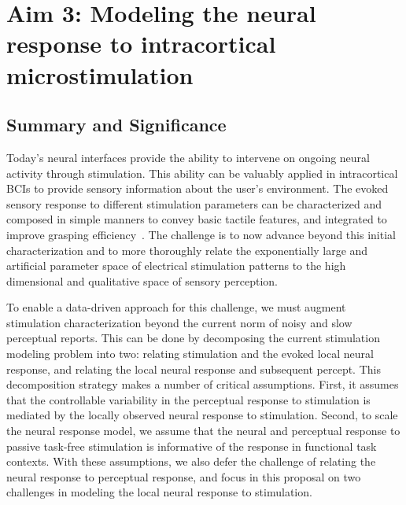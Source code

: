 \documentclass[12pt,oneside]{report}
\begin{document}

\chapter{Aim 3: Modeling the neural response to intracortical microstimulation}


\section{Summary and Significance}

Today’s neural interfaces provide the ability to intervene on ongoing neural activity through stimulation. This ability can be valuably applied in intracortical BCIs to provide sensory information about the user’s environment. The evoked sensory response to different stimulation parameters can be characterized and composed in simple manners to convey basic tactile features, and integrated to improve grasping efficiency~\citep{flesher2021functional,valle2025tactile}. The challenge is to now advance beyond this initial characterization and to more thoroughly relate the exponentially large and artificial parameter space of electrical stimulation patterns to the high dimensional and qualitative space of sensory perception.

To enable a data-driven approach for this challenge, we must augment stimulation characterization beyond the current norm of noisy and slow perceptual reports. This can be done by decomposing the current stimulation modeling problem into two: relating stimulation and the evoked local neural response, and relating the local neural response and subsequent percept. This decomposition strategy makes a number of critical assumptions. First, it assumes that the controllable variability in the perceptual response to stimulation is mediated by the locally observed neural response to stimulation. Second, to scale the neural response model, we assume that the neural and perceptual response to passive task-free stimulation is informative of the response in functional task contexts. With these assumptions, we also defer the challenge of relating the neural response to perceptual response, and focus in this proposal on two challenges in modeling the local neural response to stimulation.
\end{document}
